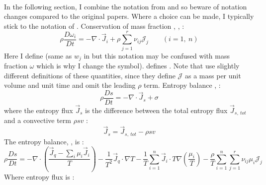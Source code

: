 \label{sect:thermodynamic}
\\

\noindent
In the following section, I combine the notation from \cite{DM62} and \cite{ABE95} so beware of notation changes compared to the original papers.  Where a choice can be made, I typically stick to the notation of \cite{ABE95}.  Conservation of mass fraction \cite[Eq.~II.13,][]{DM62}, \cite[also Eq.~A2,][]{ABE95}, :
\begin{equation}
\rho \frac{D \omega_i}{Dt} = -\nabla \cdot \vec{J}_i + \rho \sum_{j=1}^r \nu_{ij} \mathcal{J}_j \qquad (i=1,\ n)
\label{eq:ABE95_A2}
\end{equation}
Here I define  (same as $w_j$ in \cite{ABE95} but this notation may be confused with mass fraction $\omega$ which is why I change the symbol).  \cite{ABE95} defines .  Note that \cite{DM62} use slightly different definitions of these quantities, since they define $\mathcal{J}$ as a mass per unit volume and unit time and omit the leading $\rho$ term.  Entropy balance \cite[Eq.~III.12,][]{DM62}, \cite[also Eq.~A4,][]{ABE95}:
\begin{equation}
\rho \frac{Ds}{Dt} = - \nabla \cdot \vec{J}_s + \sigma
\label{DM62_ch3_eq12}
\end{equation}
where the entropy flux $\vec{J}_s$ is the difference between the total entropy flux $\vec{J}_{s,\ tot}$ and a convective term $\rho s v$ \cite[Eq.~III.13,][]{DM62}:
\begin{equation}
\vec{J}_s = \vec{J}_{s,\ tot} - \rho s v
\end{equation}
The entropy balance, , is \cite[Eq.~III.19,][]{DM62}:
\begin{equation}
\rho \frac{Ds}{Dt} = - \nabla \cdot \left( \frac{\vec{J}_q - \sum_i \mu_i \vec{J}_i}{T} \right) - \frac{1}{T^2} \vec{J}_q \cdot \nabla T - \frac{1}{T} \sum_{i=1}^n \vec{J}_i \cdot T \nabla \left( \frac{\mu_i}{T} \right) - \frac{\rho}{T} \sum_{i=1}^n \sum_{j=1}^r \nu_{ij} \mu_i \mathcal{J}_j 
\end{equation}
Where entropy flux is \cite[Eq.~III.20,][]{DM62}:
